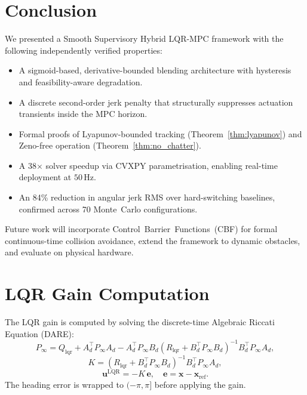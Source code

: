 \documentclass[journal]{IEEEtran}
\begin{document}
\section{Conclusion}\label{sec:conclusion}

We presented a Smooth Supervisory Hybrid LQR-MPC framework with the following
independently verified properties:
\begin{itemize}
  \item A sigmoid-based, derivative-bounded blending architecture with
    hysteresis and feasibility-aware degradation.
  \item A discrete second-order jerk penalty that structurally suppresses
    actuation transients inside the MPC horizon.
  \item Formal proofs of Lyapunov-bounded tracking (Theorem~\ref{thm:lyapunov})
    and Zeno-free operation (Theorem~\ref{thm:no_chatter}).
  \item A 38$\times$ solver speedup via CVXPY parametrisation, enabling
    real-time deployment at $50\,\text{Hz}$.
  \item An 84\% reduction in angular jerk RMS over hard-switching baselines,
    confirmed across 70 Monte~Carlo configurations.
\end{itemize}

Future work will incorporate Control~Barrier~Functions~(CBF) for formal
continuous-time collision avoidance, extend the framework to dynamic
obstacles, and evaluate on physical hardware.

\appendix

\section{LQR Gain Computation}\label{app:lqr}

The LQR gain is computed by solving the discrete-time Algebraic Riccati
Equation (DARE):
\[
  P_\infty = Q_{\mathrm{lqr}} + A_d^\top P_\infty A_d -
             A_d^\top P_\infty B_d(R_{\mathrm{lqr}} + B_d^\top P_\infty B_d)^{-1}
             B_d^\top P_\infty A_d,
\]
\[
  K = (R_{\mathrm{lqr}} + B_d^\top P_\infty B_d)^{-1} B_d^\top P_\infty A_d,
\]
\[
  \mathbf{u}^{\mathrm{LQR}} = -K\,\mathbf{e},\quad
  \mathbf{e} = \mathbf{x} - \mathbf{x}_{\mathrm{ref}}.
\]
The heading error is wrapped to $(-\pi, \pi]$ before applying the gain.
\end{document}
